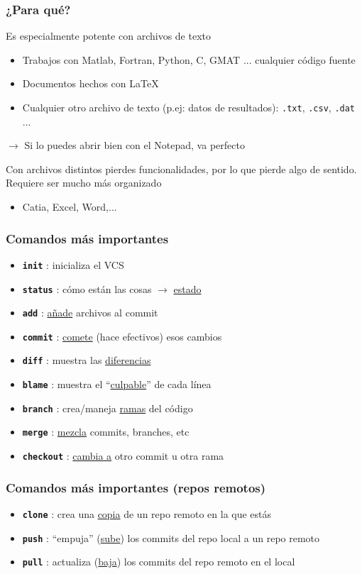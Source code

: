 \documentclass{beamer}
\begin{document}
\begin{frame}\frametitle{¿Para qué?}
	Es especialmente potente con archivos de texto
	\begin{itemize}
		\item Trabajos con Matlab, Fortran, Python, C, GMAT ... cualquier código fuente
		\item Documentos hechos con \LaTeX
		\item Cualquier otro archivo de texto (p.ej: datos de resultados): \texttt{.txt}, \texttt{.csv}, \texttt{.dat} ...
	\end{itemize}
	$\rightarrow$ Si lo puedes abrir bien con el Notepad, va perfecto

	Con archivos distintos pierdes funcionalidades, por lo que pierde algo de sentido. Requiere ser mucho más organizado
	\begin{itemize}
		\item Catia, Excel, Word,...
	\end{itemize}
\end{frame}

\begin{frame}\frametitle{Comandos más importantes}
	\begin{itemize}
		\item \textbf{\texttt{init}		}: inicializa el VCS
		\item \textbf{\texttt{status}	}: cómo están las cosas $\rightarrow$ \underline{estado}
		\item \textbf{\texttt{add}		}: \underline{añade} archivos al commit
		\item \textbf{\texttt{commit}	}: \underline{comete} (hace efectivos) esos cambios
		\item \textbf{\texttt{diff}		}: muestra las \underline{diferencias}
		\item \textbf{\texttt{blame}	}: muestra el ``\underline{culpable}'' de cada línea
		\item \textbf{\texttt{branch}	}: crea/maneja \underline{ramas} del código
		\item \textbf{\texttt{merge}	}: \underline{mezcla} commits, branches, etc
		\item \textbf{\texttt{checkout}	}: \underline{cambia a} otro commit u otra rama
	\end{itemize}
\end{frame}

\begin{frame}\frametitle{Comandos más importantes (repos remotos)}
	\begin{itemize}
		\item \textbf{\texttt{clone}	}: crea una \underline{copia} de un repo remoto en la que estás
		\item \textbf{\texttt{push}		}: ``empuja'' (\underline{sube}) los commits del repo local a un repo remoto
		\item \textbf{\texttt{pull}		}: actualiza (\underline{baja}) los commits del repo remoto en el local
	\end{itemize}
\end{frame}
\end{document}
